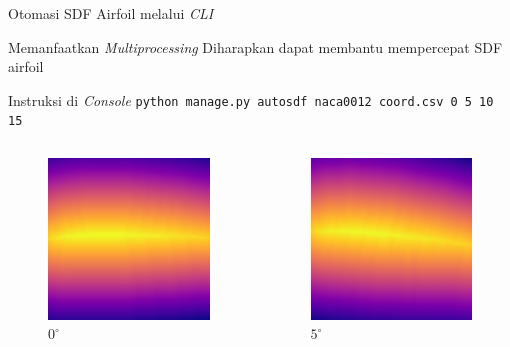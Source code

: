 \begin{frame}{Otomasi SDF Airfoil melalui \textit{CLI}}
  \begin{block}{Memanfaatkan \textit{Multiprocessing}}
    Diharapkan dapat membantu mempercepat SDF airfoil
  \end{block}

  \begin{block}{Instruksi di \textit{Console}}
    \texttt{python manage.py autosdf naca0012 coord.csv 0 5 10 15}
  \end{block}

  \begin{columns}[t]
    \begin{column}{.25\linewidth}
      \begin{figure}[h]
        \centering
        \includegraphics[width=0.5\linewidth]{statics/naca0012_0.0}
        \caption{$0^\circ$}
      \end{figure}
    \end{column}

    \begin{column}{.25\linewidth}
      \begin{figure}[h]
        \centering
        \includegraphics[width=0.5\linewidth]{statics/naca0012_5.0}
        \caption{$5^\circ$}
      \end{figure}
    \end{column}


\end{columns}
\end{frame}
